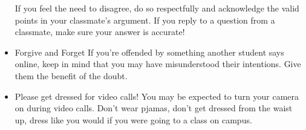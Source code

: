 \documentclass{article}
\begin{document}
\begin{itemize}
    If you feel the need to disagree, do so respectfully and acknowledge the valid points in your classmate's argument. If you reply to a question from a classmate, make sure your answer is accurate!
    \item Forgive and Forget
    If you’re offended by something another student says online, keep in mind that you may have misunderstood their intentions. Give them the benefit of the doubt.
    \item Please get dressed for video calls!
     You may be expected to turn your camera on during video calls. Don't wear pjamas, don’t get dressed from the waist up, dress like you would if you were going to a 
     class on campus.
 \end{itemize}
\end{document}
